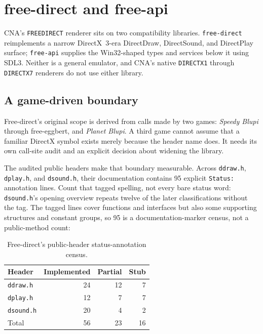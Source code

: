 \chapter{free-direct and free-api}
\label{ch:freedirect-freeapi}
\label{ch:freedirect-deep-dive}

CNA's \texttt{FREEDIRECT} renderer sits on two compatibility libraries. \texttt{free-direct}
reimplements a narrow DirectX~3-era DirectDraw, DirectSound, and DirectPlay surface;
\texttt{free-api} supplies the Win32-shaped types and services below it using SDL3. Neither is
a general emulator, and CNA's native \texttt{DIRECTX1} through \texttt{DIRECTX7} renderers do
not use either library.

\section{A game-driven boundary}

Free-direct's original scope is derived from calls made by two games: \emph{Speedy Blupi}
through free-eggbert, and \emph{Planet Blupi}. A third game cannot assume that a familiar
DirectX symbol exists merely because the header name does. It needs its own call-site audit and
an explicit decision about widening the library.

The audited public headers make that boundary measurable. Across \texttt{ddraw.h},
\texttt{dplay.h}, and \texttt{dsound.h}, their documentation contains 95 explicit
\texttt{Status:} annotation lines. Count that tagged spelling, not every bare status word:
\texttt{dsound.h}'s opening overview repeats twelve of the later classifications without the
tag. The tagged lines cover functions and interfaces but also some supporting structures and
constant groups, so 95 is a documentation-marker census, not a public-method count:

\begin{table}[htbp]
  \centering
  \caption{Free-direct's public-header status-annotation census.}
  \label{tab:freedirect-status}
  \begin{tabular}{@{}lrrr@{}}
    \toprule
    Header & Implemented & Partial & Stub \\
    \midrule
    \texttt{ddraw.h} & 24 & 12 & 7 \\
    \texttt{dplay.h} & 12 & 7 & 7 \\
    \texttt{dsound.h} & 20 & 4 & 2 \\
    \midrule
    Total & 56 & 23 & 16 \\
    \bottomrule
  \end{tabular}
\end{table}

